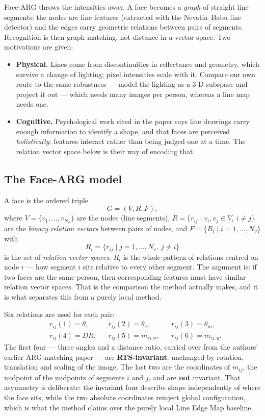 \documentclass[11pt]{article}
\begin{document}
Face-ARG throws the intensities away. A face becomes a \emph{graph} of straight
line segments: the nodes are line features (extracted with the Nevatia--Babu
line detector) and the edges carry geometric relations between pairs of
segments. Recognition is then graph matching, not distance in a vector space.
Two motivations are given:
\begin{itemize}
\item \textbf{Physical.} Lines come from discontinuities in reflectance and
  geometry, which survive a change of lighting; pixel intensities scale with it.
  Compare our own route to the same robustness --- model the lighting as a 3-D
  subspace and project it out --- which needs many images per person, whereas a
  line map needs one.
\item \textbf{Cognitive.} Psychological work cited in the paper says line
  drawings carry enough information to identify a shape, and that faces are
  perceived \emph{holistically}: features interact rather than being judged one
  at a time. The relation vector space below is their way of encoding that.
\end{itemize}

\subsection{The Face-ARG model}
A face is the ordered triple
\begin{equation}
G=(V,R,F),
\end{equation}
where $V=\{v_1,\dots,v_{N_v}\}$ are the nodes (line segments),
$R=\{r_{ij}\mid v_i,v_j\in V,\ i\neq j\}$ are the \emph{binary relation
vectors} between pairs of nodes, and $F=\{R_i\mid i=1,\dots,N_v\}$ with
\[ R_i=\{r_{ij}\mid j=1,\dots,N_v,\ j\neq i\} \]
is the set of \emph{relation vector spaces}. $R_i$ is the whole pattern of
relations centred on node $i$ --- how segment $i$ sits relative to every other
segment. The argument is: if two faces are the same person, then corresponding
features must have similar relation vector spaces. That is the comparison the
method actually makes, and it is what separates this from a purely local method.

Six relations are used for each pair:
\begin{equation}
\begin{aligned}
&r_{ij}(1)=\theta, && r_{ij}(2)=\theta_c, && r_{ij}(3)=\theta_m,\\
&r_{ij}(4)=DR, && r_{ij}(5)=m_{ij,x}, && r_{ij}(6)=m_{ij,y}.
\end{aligned}
\end{equation}
The first four --- three angles and a distance ratio, carried over from the
authors' earlier ARG-matching paper --- are \textbf{RTS-invariant}: unchanged by
rotation, translation and scaling of the image. The last two are the
coordinates of $m_{ij}$, the midpoint of the midpoints of segments $i$ and $j$,
and are \textbf{not} invariant. That asymmetry is deliberate: the invariant four
describe shape independently of where the face sits, while the two absolute
coordinates reinject global configuration, which is what the method claims over
the purely local Line Edge Map baseline.
\end{document}

